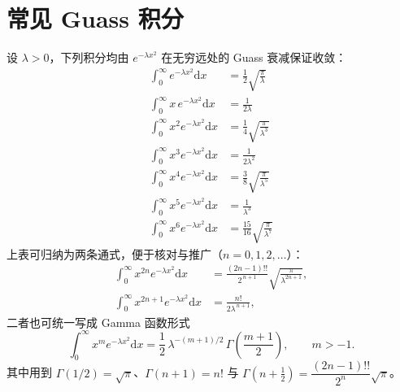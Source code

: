 \documentclass[11pt,a4paper,openany]{ctexbook}
\newcommand{\dd}{\mathrm d}
\begin{document}
\chapter{常见 Guass 积分}
设 $\lambda>0$，下列积分均由 $e^{-\lambda x^{2}}$ 在无穷远处的 Guass 衰减保证收敛：
\begin{align*}
\int_{0}^{\infty} e^{-\lambda x^{2}}\dd x
  &= \frac{1}{2}\sqrt{\frac{\pi}{\lambda}} \\[2pt]
\int_{0}^{\infty} x\,e^{-\lambda x^{2}}\dd x
  &= \frac{1}{2\lambda} \\[2pt]
\int_{0}^{\infty} x^{2}e^{-\lambda x^{2}}\dd x
  &= \frac{1}{4}\sqrt{\frac{\pi}{\lambda^{3}}} \\[2pt]
\int_{0}^{\infty} x^{3}e^{-\lambda x^{2}}\dd x
  &= \frac{1}{2\lambda^{2}} \\[2pt]
\int_{0}^{\infty} x^{4}e^{-\lambda x^{2}}\dd x
  &= \frac{3}{8}\sqrt{\frac{\pi}{\lambda^{5}}} \\[2pt]
\int_{0}^{\infty} x^{5}e^{-\lambda x^{2}}\dd x
  &= \frac{1}{\lambda^{3}} \\[2pt]
\int_{0}^{\infty} x^{6}e^{-\lambda x^{2}}\dd x
  &= \frac{15}{16}\sqrt{\frac{\pi}{\lambda^{7}}}
\end{align*}
上表可归纳为两条通式，便于核对与推广（$n=0,1,2,\dots$）：
\begin{align*}
\int_{0}^{\infty} x^{2n}e^{-\lambda x^{2}}\dd x
  &= \frac{(2n-1)!!}{2^{\,n+1}}\sqrt{\frac{\pi}{\lambda^{2n+1}}}, \\[2pt]
\int_{0}^{\infty} x^{2n+1}e^{-\lambda x^{2}}\dd x
  &= \frac{n!}{2\lambda^{\,n+1}},
\end{align*}
二者也可统一写成 Gamma 函数形式
\begin{equation*}
\int_{0}^{\infty} x^{m}e^{-\lambda x^{2}}\dd x
  = \frac{1}{2}\,\lambda^{-(m+1)/2}\,\Gamma\!\left(\frac{m+1}{2}\right),
  \qquad m>-1 .
\end{equation*}
其中用到 $\Gamma(1/2)=\sqrt{\pi}$、$\Gamma(n+1)=n!$ 与
$\Gamma\!\left(n+\tfrac12\right)=\dfrac{(2n-1)!!}{2^{n}}\sqrt{\pi}$。

\vfill
\end{document}
